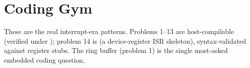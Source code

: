 \section{Coding Gym}

\begin{partnote}
These are the real interrupt-era patterns. Problems 1--13 are host-compilable
(verified under ); problem 14 is
 (a device-register ISR skeleton), syntax-validated against
register stubs. The ring buffer (problem 1) is the single most-asked embedded
coding question.
\end{partnote}

